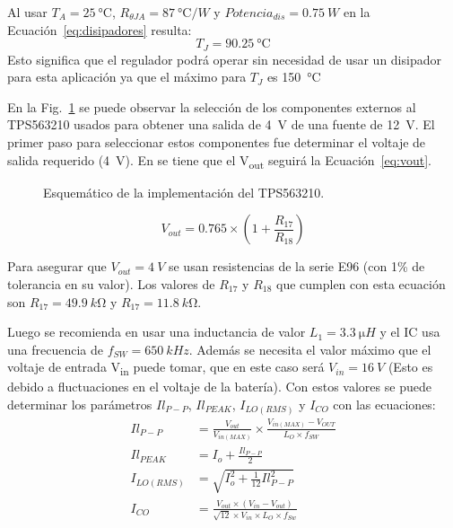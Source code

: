Al usar $T_A=\SI{25}{\celsius}$,  $R_{\theta JA}=\SI{87}{\celsius/W}$ y $Potencia_{dis}=\SI{0.75}{W}$ en  la Ecuación~\ref{eq:disipadores} resulta:
$$T_J=\SI{90.25}{\celsius}$$
Esto significa que el regulador podrá operar sin necesidad de usar un disipador para esta aplicación ya que el máximo para $T_J$ es \SI{150}{\celsius}


En la Fig.~\ref{fig:esquem_switching} se puede observar la selección de los componentes externos al TPS563210 usados para obtener una salida de \SI{4}{V} de una fuente de \SI{12}{V}. El primer paso para seleccionar estos componentes fue determinar el voltaje de salida requerido (\SI{4}{V}). En \cite{TPS563210} se tiene que el V\textsubscript{out} seguirá la Ecuación~\ref{eq:vout}.
\begin{figure}[hbtp!]
\centering
{}%
\caption{Esquemático de la implementación del TPS563210.}
\label{fig:esquem_switching}
\end{figure}

\begin{equation}
    V_{out}=0.765\times(1+\frac{R_{17}}{R_{18}})
    \label{eq:vout}
\end{equation}

Para asegurar que $V_{out}=\SI{4}{V}$ se usan resistencias de la serie E96 (con 1\% de tolerancia en su valor). Los valores de $R_{17}$ y $R_{18}$ que cumplen con esta ecuación son $R_{17}=\SI{49.9}{k\ohm}$ y $R_{17}=\SI{11.8}{k\ohm}$.

Luego se recomienda en \cite{TPS563210} usar una inductancia de valor $L_1=\SI{3.3}{\micro H}$ y el IC usa una frecuencia de $f_{SW}=\SI{650}{kHz}$. Además se necesita el valor máximo que el voltaje de entrada V\textsubscript{in} puede tomar, que en este caso será $V_{in}=\SI{16}{V}$ (Esto es debido a fluctuaciones en el voltaje de la batería). Con estos valores se puede determinar los parámetros $Il_{P-P}$, $Il_{PEAK}$,  $I_{LO(RMS)}$ y $I_{CO}$ con las ecuaciones:
\begin{align}
Il_{P-P}&=\frac{V_{out}}{V_{in(MAX)}}\times\frac{V_{in(MAX)}-V_{OUT}}{L_O\times f_{SW}} \label{eq:current1}\\
Il_{PEAK}&=I_{o}+\frac{Il_{P-P}}{2} \label{eq:current2}\\
I_{LO(RMS)}&=\sqrt{I_o^2+\frac{1}{12}Il_{P-P}^2} \label{eq:current3} \\
I_{CO}&=\frac{V_{out}\times (V_{in}-V_{out})}{\sqrt{12}\times V_{in}\times L_{O} \times f_{Sw}} \label{eq:current4}
\end{align}

